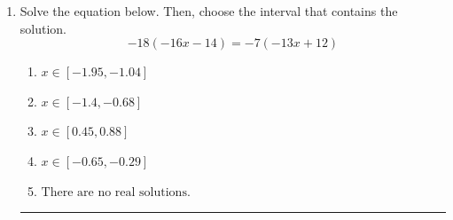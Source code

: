 \documentclass[14pt]{extbook}
\newcommand{\litem}[1]{\item#1\hspace*{-1cm}\rule{\textwidth}{0.4pt}}
\begin{document}
\begin{enumerate}
{\begin{enumerate}[label=\Alph*.]
\end{enumerate} }
\litem{
Solve the equation below. Then, choose the interval that contains the solution.\[ -18(-16x -14) = -7(-13x + 12) \]\begin{enumerate}[label=\Alph*.]
\item \( x \in [-1.95, -1.04] \)
\item \( x \in [-1.4, -0.68] \)
\item \( x \in [0.45, 0.88] \)
\item \( x \in [-0.65, -0.29] \)
\item \( \text{There are no real solutions.} \)

\end{enumerate} }
\end{enumerate}
\end{document}
